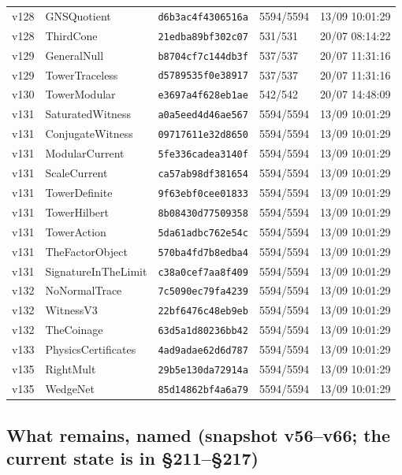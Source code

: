 \documentclass[11pt]{article}
\theoremstyle{definition}\newtheorem{deriv}{Derivation}
\begin{document}
{\begin{longtable}{@{}lllll@{}}
v128 & GNSQuotient & \texttt{d6b3ac4f4306516a} & 5594/5594 & 13/09 10:01:29 \\
v128 & ThirdCone & \texttt{21edba89bf302c07} & 531/531 & 20/07 08:14:22 \\
v129 & GeneralNull & \texttt{b8704cf7c144db3f} & 537/537 & 20/07 11:31:16 \\
v129 & TowerTraceless & \texttt{d5789535f0e38917} & 537/537 & 20/07 11:31:16 \\
v130 & TowerModular & \texttt{e3697a4f628eb1ae} & 542/542 & 20/07 14:48:09 \\
v131 & SaturatedWitness & \texttt{a0a5eed4d46ae567} & 5594/5594 & 13/09 10:01:29 \\
v131 & ConjugateWitness & \texttt{09717611e32d8650} & 5594/5594 & 13/09 10:01:29 \\
v131 & ModularCurrent & \texttt{5fe336cadea3140f} & 5594/5594 & 13/09 10:01:29 \\
v131 & ScaleCurrent & \texttt{ca57ab98df381654} & 5594/5594 & 13/09 10:01:29 \\
v131 & TowerDefinite & \texttt{9f63ebf0cee01833} & 5594/5594 & 13/09 10:01:29 \\
v131 & TowerHilbert & \texttt{8b08430d77509358} & 5594/5594 & 13/09 10:01:29 \\
v131 & TowerAction & \texttt{5da61adbc762e54c} & 5594/5594 & 13/09 10:01:29 \\
v131 & TheFactorObject & \texttt{570ba4fd7b8edba4} & 5594/5594 & 13/09 10:01:29 \\
v131 & SignatureInTheLimit & \texttt{c38a0cef7aa8f409} & 5594/5594 & 13/09 10:01:29 \\
v132 & NoNormalTrace & \texttt{7c5090ec79fa4239} & 5594/5594 & 13/09 10:01:29 \\
v132 & WitnessV3 & \texttt{22bf6476c48eb9eb} & 5594/5594 & 13/09 10:01:29 \\
v132 & TheCoinage & \texttt{63d5a1d80236bb42} & 5594/5594 & 13/09 10:01:29 \\
v133 & PhysicsCertificates & \texttt{4ad9adae62d6d787} & 5594/5594 & 13/09 10:01:29 \\
v135 & RightMult & \texttt{29b5e130da72914a} & 5594/5594 & 13/09 10:01:29 \\
v135 & WedgeNet & \texttt{85d14862bf4a6a79} & 5594/5594 & 13/09 10:01:29 \\
\bottomrule\end{longtable}}

\subsection*{What remains, named (snapshot v56--v66; the current state is in \S211--\S217)}
\end{document}
